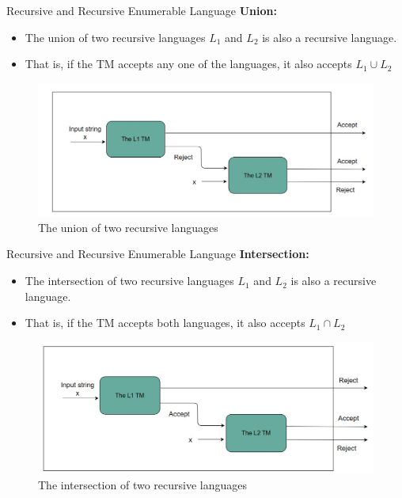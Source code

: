 \documentclass{beamer}
\begin{document}
\begin{frame}{Recursive and Recursive Enumerable Language}
	\textbf{Union:}
	\begin{itemize}
		\item The union of two recursive languages $L_1$ and $L_2$ is also a recursive language.
		\item That is, if the TM accepts any one of the languages, it also accepts $L_1\cup L_2$
	\end{itemize}
	\begin{figure}
		\includegraphics[scale=.4]{img5/m31}
		\caption{The union of two recursive languages}
	\end{figure}
\end{frame}
\begin{frame}{Recursive and Recursive Enumerable Language}
	\textbf{Intersection:}
	\begin{itemize}
		\item  The intersection of two recursive languages $L_1$ and $L_2$ 
		is also a recursive language.
		\item That is, if the TM accepts both languages, it also accepts $L_1\cap L_2$
	\end{itemize}
	\begin{figure}
		\includegraphics[scale=.4]{img5/m32}
		\caption{The intersection of two recursive languages}
	\end{figure}
\end{frame}
\end{document}
